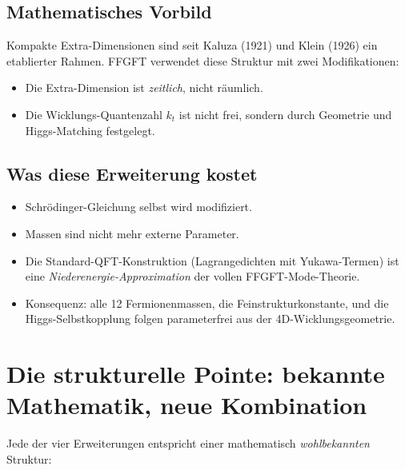 \subsection{Mathematisches Vorbild}

Kompakte Extra-Dimensionen sind seit Kaluza (1921) und Klein (1926)
ein etablierter Rahmen. FFGFT verwendet diese Struktur mit zwei
Modifikationen:
\begin{itemize}[leftmargin=2em,itemsep=2pt,topsep=2pt]
  \item Die Extra-Dimension ist \emph{zeitlich}, nicht räumlich.
  \item Die Wicklungs-Quantenzahl $k_t$ ist nicht frei, sondern
        durch Geometrie und Higgs-Matching festgelegt.
\end{itemize}

\subsection{Was diese Erweiterung kostet}

\begin{itemize}[leftmargin=2em,itemsep=2pt,topsep=2pt]
  \item Schrödinger-Gleichung selbst wird modifiziert.
  \item Massen sind nicht mehr externe Parameter.
  \item Die Standard-QFT-Konstruktion (Lagrangedichten mit
        Yukawa-Termen) ist eine \emph{Niederenergie-Approximation}
        der vollen FFGFT-Mode-Theorie.
  \item Konsequenz: alle 12 Fermionenmassen, die
        Feinstrukturkonstante, und die Higgs-Selbstkopplung
        folgen parameterfrei aus der 4D-Wicklungsgeometrie.
\end{itemize}

\section{Die strukturelle Pointe: bekannte Mathematik, neue Kombination}

Jede der vier Erweiterungen entspricht einer mathematisch \emph{wohlbekannten} Struktur:

